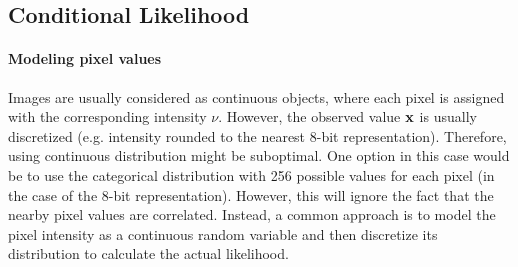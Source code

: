 
 



\subsection{Conditional Likelihood}
\paragraph{Modeling pixel values}
Images are usually considered as continuous objects, where each pixel is assigned with the corresponding intensity $\nu$. 
However, the observed value ${\mathbf{x}}$ is usually discretized (e.g. intensity rounded to the nearest 8-bit representation). 
Therefore, using continuous distribution might be suboptimal.
One option in this case would be to use the categorical distribution with 256 possible values for each pixel (in the case of the 8-bit representation). However, this will ignore the fact that the nearby pixel values are correlated. 
Instead, a common approach is to model the pixel intensity as a continuous random variable and then discretize its distribution to calculate the actual likelihood. 

